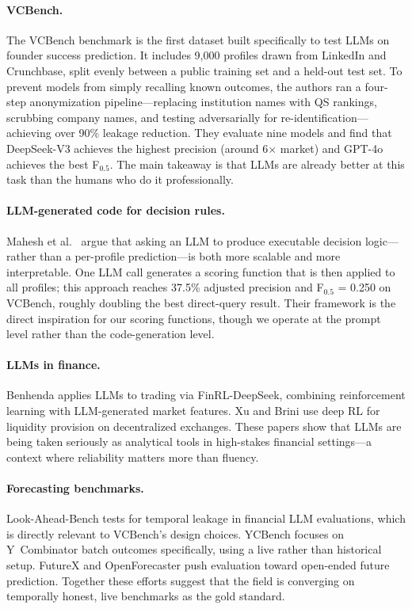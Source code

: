 \documentclass{article}
\begin{document}
\paragraph{VCBench.} The VCBench benchmark \cite{chen2025vcbench} is the first dataset built specifically to test LLMs on founder success prediction. It includes 9,000 profiles drawn from LinkedIn and Crunchbase, split evenly between a public training set and a held-out test set. To prevent models from simply recalling known outcomes, the authors ran a four-step anonymization pipeline---replacing institution names with QS rankings, scrubbing company names, and testing adversarially for re-identification---achieving over 90\% leakage reduction. They evaluate nine models and find that DeepSeek-V3 achieves the highest precision (around 6$\times$ market) and GPT-4o achieves the best F$_{0.5}$. The main takeaway is that LLMs are already better at this task than the humans who do it professionally.

\paragraph{LLM-generated code for decision rules.} Mahesh et al.~\cite{mahesh2026stochastic} argue that asking an LLM to produce executable decision logic---rather than a per-profile prediction---is both more scalable and more interpretable. One LLM call generates a scoring function that is then applied to all profiles; this approach reaches 37.5\% adjusted precision and F$_{0.5}$ = 0.250 on VCBench, roughly doubling the best direct-query result. Their framework is the direct inspiration for our scoring functions, though we operate at the prompt level rather than the code-generation level.

\paragraph{LLMs in finance.} Benhenda \cite{benhenda2025} applies LLMs to trading via FinRL-DeepSeek, combining reinforcement learning with LLM-generated market features. Xu and Brini \cite{xu2025} use deep RL for liquidity provision on decentralized exchanges. These papers show that LLMs are being taken seriously as analytical tools in high-stakes financial settings---a context where reliability matters more than fluency.

\paragraph{Forecasting benchmarks.} Look-Ahead-Bench \cite{benhenda2026lookaheadbench} tests for temporal leakage in financial LLM evaluations, which is directly relevant to VCBench's design choices. YCBench \cite{benhenda2026ycbench} focuses on Y~Combinator batch outcomes specifically, using a live rather than historical setup. FutureX \cite{zeng2025} and OpenForecaster \cite{chandak2026} push evaluation toward open-ended future prediction. Together these efforts suggest that the field is converging on temporally honest, live benchmarks as the gold standard.
\end{document}
